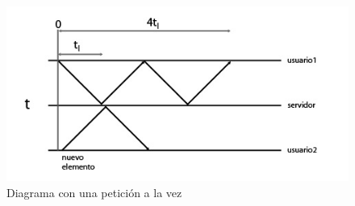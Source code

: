 \begin{figure}[h!]
\centering
\includegraphics[totalheight=6cm]{tfijo.jpg}
\caption{Diagrama con una petición a la vez}\label{fig:tfijo}
\end{figure}



